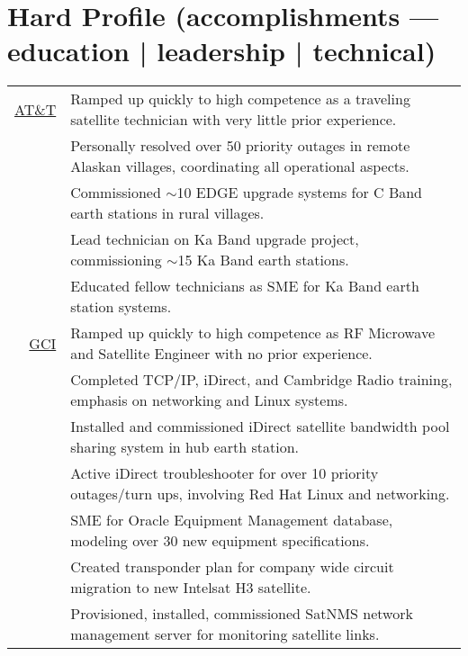 \documentclass[letter,11pt]{article}
\begin{document}
\vspace{6pt}

\section{Hard Profile \small(accomplishments --- education | leadership | technical)}
\begin{center}

\footnotesize{
\hspace{10pt} %
\begin{tabular}{r|l}
\addlinespace[6pt]

		\href{https://en.wikipedia.org/wiki/AT&T_Alascom}{\textsc{AT\&T}}
	&	\scriptsize{Ramped up quickly to high competence as a traveling satellite technician with very little prior experience.}
	\\
		\rule{0pt}{8pt}
	&	\scriptsize{Personally resolved over 50 priority outages in remote Alaskan villages, coordinating all operational aspects.}
	\\
		\rule{0pt}{8pt}
	&	\scriptsize{Commissioned $\sim$10 EDGE upgrade systems for C Band earth stations in rural villages.}
	\\
		\rule{0pt}{8pt}
	&	\scriptsize{Lead technician on Ka Band upgrade project, commissioning $\sim$15 Ka Band earth stations.}
	\\
		\rule{0pt}{8pt}
	&	\scriptsize{Educated fellow technicians as SME for Ka Band earth station systems.}
	\\
	
\addlinespace[8pt]
		
		\href{https://www.gci.com}{\textsc{GCI}}
	&	\scriptsize{Ramped up quickly to high competence as RF Microwave and Satellite Engineer with no prior experience.}
	\\
		\rule{0pt}{8pt}
	&	\scriptsize{Completed TCP/IP, iDirect, and Cambridge Radio training, emphasis on networking and Linux systems.}
	\\
		\rule{0pt}{8pt}
	&	\scriptsize{Installed and commissioned iDirect satellite bandwidth pool sharing system in hub earth station.}
	\\
		\rule{0pt}{8pt}
	&	\scriptsize{Active iDirect troubleshooter for over 10 priority outages/turn ups, involving Red Hat Linux and networking.}
	\\
		\rule{0pt}{8pt}
	&	\scriptsize{SME for Oracle Equipment Management database, modeling over 30 new equipment specifications.}
	\\
		\rule{0pt}{8pt}
	&	\scriptsize{Created transponder plan for company wide circuit migration to new Intelsat H3 satellite.}
	\\
		\rule{0pt}{8pt}
	&	\scriptsize{Provisioned, installed, commissioned SatNMS network management server for monitoring satellite links.}
	\\
	

\end{tabular}}
\end{center}
\end{document}
